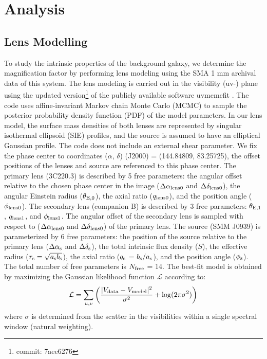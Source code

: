 \documentclass[twocolumn,apj,numberedappendix]{emulateapj}
\begin{document}
\section{Analysis}
\subsection{Lens Modelling} \label{sec:Lens} 
To study the intrinsic properties of the background galaxy, we determine the magnification factor by performing
lens modeling using the SMA 1 mm archival data of this system. The lens modeling is carried out in the visibility
(uv-) plane using the updated version\footnote{commit: 7aee6276} of the publicly available software {\sc uvmcmcfit}
\citep{Bussmann15a}. The code uses affine-invariant Markov chain Monte Carlo (MCMC) to sample the posterior
probability density function (PDF) of the model parameters. In our lens model, the surface mass densities of both
lenses are represented by singular isothermal ellipsoid (SIE) profiles, and the source is assumed to have an
elliptical Gaussian profile. The code does not include an external shear parameter. \newline
We fix the phase center to coordinates ($\alpha$, $\delta$) (J2000) = (144.84809\degr, 83.25725\degr), the
offset positions of the lenses and source are referenced to this phase center. The primary lens (3C220.3) is
described by 5 free parameters: the angular offset relative to
the chosen phase center in the image ($\Delta \alpha_{\rm
lens0}$ and $\Delta \delta_{\rm lens0}$), the angular Einstein radius ($\theta_{\rm E,0}$), the
axial ratio ($q_{\rm lens0}$), and the position angle ($\phi_{\rm lens0}$). The secondary lens (companion B) is
described by 3 free parameters: $\theta_{\rm E,1}$, $q_{\rm lens1}$, and $\phi_{\rm lens1}$. The angular offset
of the secondary
lens is sampled with respect to ($\Delta \alpha_{\rm lens0}$ and $\Delta \delta_{\rm lens0}$) of
the primary lens.
The source (SMM J0939) is parameterized by
6 free parameters: the position of the source relative to the
primary lens ($\Delta \alpha_{\rm s}$ and $\Delta
\delta_{\rm s}$), the total intrinsic flux density ($S$), the
effective radius ($r_{\rm s} = \sqrt{a_{\rm s} b_{\rm s}}$), the axial
ratio ($q_{\rm s}$ =  $b_{\rm s}/a_{\rm s}$), and the position angle
($\phi_{\rm s}$).
The total number of free parameters is $N_{\rm free}$ = 14. The best-fit model is obtained by maximizing the
Gaussian likelihood function $ \mathcal{L} $ according to:
\begin{equation}
    \mathcal{L} = \sum_{u, v}\left( \frac{|V_{\rm data} - V_{\rm
    model}|^2}{\sigma^2} + {\rm log}(2 \pi \sigma^2) \right)
\end{equation}
\noindent where $\sigma$ is determined from the scatter in the visibilities within a
single spectral window (natural weighting).
\end{document}
